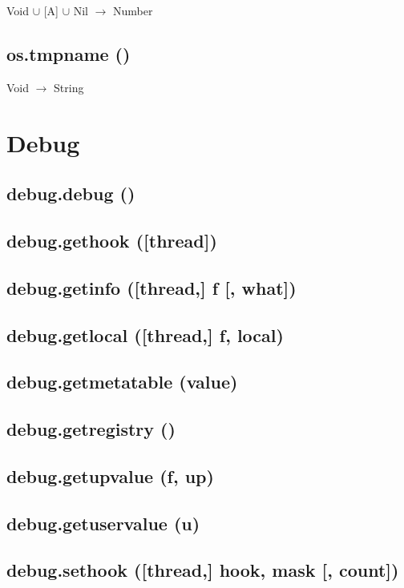 \documentclass[12pt]{article}
\begin{document}
Void $\cup$ [A] $\cup$ Nil $\rightarrow$ Number

\subsection{os.tmpname ()}

Void $\rightarrow$ String

\newpage

\section{Debug}

\subsection{debug.debug ()}

\subsection{debug.gethook ([thread])}

\subsection{debug.getinfo ([thread,] f [, what])}

\subsection{debug.getlocal ([thread,] f, local)}

\subsection{debug.getmetatable (value)}

\subsection{debug.getregistry ()}

\subsection{debug.getupvalue (f, up)}

\subsection{debug.getuservalue (u)}

\subsection{debug.sethook ([thread,] hook, mask [, count])}
\end{document}
